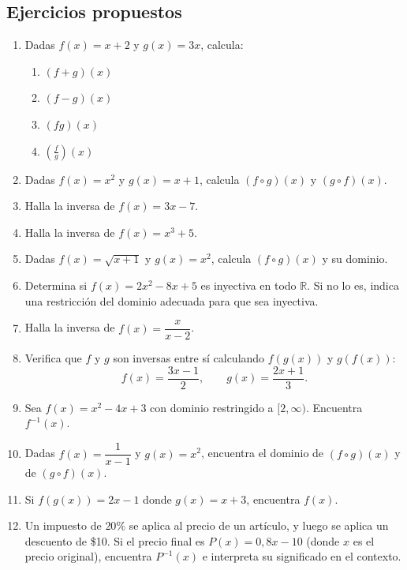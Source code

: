 \documentclass[12pt, a4paper]{article}
\begin{document}
\subsection{Ejercicios propuestos}

\begin{enumerate}[leftmargin=*, resume]
  \item \facil{} Dadas $f(x) = x + 2$ y $g(x) = 3x$, calcula:
        \begin{enumerate}[label=\alph*)]
          \item $(f + g)(x)$
          \item $(f - g)(x)$
          \item $(fg)(x)$
          \item $\left(\frac{f}{g}\right)(x)$
        \end{enumerate}

  \item \facil{} Dadas $f(x) = x^2$ y $g(x) = x + 1$, calcula $(f \circ g)(x)$ y $(g \circ f)(x)$.

  \item \facil{} Halla la inversa de $f(x) = 3x - 7$.

  \item \facil{} Halla la inversa de $f(x) = x^3 + 5$.

  \item \medio{} Dadas $f(x) = \sqrt{x + 1}$ y $g(x) = x^2$, calcula $(f \circ g)(x)$ y su dominio.

  \item \medio{} Determina si $f(x) = 2x^2 - 8x + 5$ es inyectiva en todo $\mathbb{R}$. Si no lo es, indica una restricción del dominio adecuada para que sea inyectiva.

  \item \medio{} Halla la inversa de $f(x) = \dfrac{x}{x - 2}$.

  \item \medio{} Verifica que $f$ y $g$ son inversas entre sí calculando $f(g(x))$ y $g(f(x))$:
        $$f(x) = \frac{3x - 1}{2}, \qquad g(x) = \frac{2x + 1}{3}.$$

  \item \dificil{} Sea $f(x) = x^2 - 4x + 3$ con dominio restringido a $[2, \infty)$. Encuentra $f^{-1}(x)$.

  \item \dificil{} Dadas $f(x) = \dfrac{1}{x - 1}$ y $g(x) = x^2$, encuentra el dominio de $(f \circ g)(x)$ y de $(g \circ f)(x)$.

  \item \dificil{} Si $f(g(x)) = 2x - 1$ donde $g(x) = x + 3$, encuentra $f(x)$.

  \item \dificil{} Un impuesto de $20\%$ se aplica al precio de un artículo, y luego se aplica un descuento de \$10. Si el precio final es $P(x) = 0{,}8x - 10$ (donde $x$ es el precio original), encuentra $P^{-1}(x)$ e interpreta su significado en el contexto.
\end{enumerate}
\end{document}

